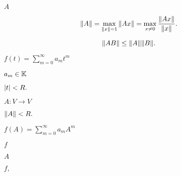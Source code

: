 \documentclass[10pt]{book}
\begin{document}
\begin{mdSnippets}
\begin{mdInlineSnippet}[7fc56270e7a70fa81a5935b72eacbe29]%
$A$\end{mdInlineSnippet}%
\begin{mdDisplaySnippet}[d5aff0e4c6f157e3a8e4662e3a7af175]%
\[%
\norm{A} = \max_{\norm{x} = 1} \norm{Ax} = \max_{x \ne 0} \frac{\norm{Ax}}{\norm{x}}.
\]%
\end{mdDisplaySnippet}%
\begin{mdDisplaySnippet}[7c9e0f88615d3c4f2d6bc208c81aaf1a]%
\[%
\norm{AB} \le \norm{A} \norm{B}.
\]%
\end{mdDisplaySnippet}%
\begin{mdInlineSnippet}[564c457289d6b706c933f3efcdcc2b15]%
$f(t) = \sum_{m=0}^\infty a_m t^m$\end{mdInlineSnippet}%
\begin{mdInlineSnippet}%
$a_m \in \mathbb{K}$\end{mdInlineSnippet}%
\begin{mdInlineSnippet}[850da3624f1462d945cb86c5d130168b]%
$\left\vert t\right\vert < R.$\end{mdInlineSnippet}%
\begin{mdInlineSnippet}[3803e0504fbff96c773375f64b1287d1]%
$A: V \to V$\end{mdInlineSnippet}%
\begin{mdInlineSnippet}[b0aa44afe6c5207015f3962860657e1c]%
$\norm{A} < R.$\end{mdInlineSnippet}%
\begin{mdInlineSnippet}%
$f(A) = \sum_{m=0}^\infty a_m A^m$\end{mdInlineSnippet}%
\begin{mdInlineSnippet}%
$f$\end{mdInlineSnippet}%
\begin{mdInlineSnippet}[7fc56270e7a70fa81a5935b72eacbe29]%
$A$\end{mdInlineSnippet}%
\begin{mdInlineSnippet}[0e05bed100c5460dd523f83322b3e4d7]%
$f,$\end{mdInlineSnippet}%
\begin{mdInlineSnippet}[f0f61960351d7b08f6fd3e5212f1b01c]%

\end{mdInlineSnippet}
\end{mdSnippets}
\end{document}
